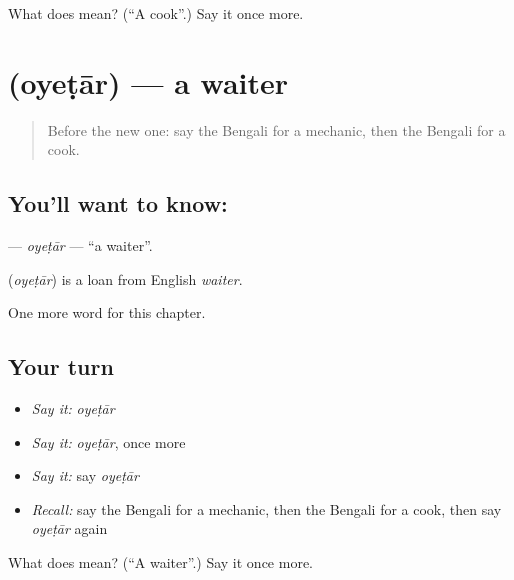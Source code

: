 \begin{tcolorbox}[breakable,colback=teal!4,colframe=teal!35!black,title={Before you move on}]
What does  mean? (\textquotedblleft{}A cook\textquotedblright{}.) Say it once more.
\end{tcolorbox}
\section[\texorpdfstring{\bn{ওয়েটার} (oyeṭār)}{ওয়েটার (oyeṭār)}]{ (oyeṭār) — a waiter}

\label{lesson:BN-C261-oyetar}



\begin{quote}
Before the new one: say the Bengali for a mechanic, then the Bengali for a cook.
\end{quote}

\subsection*{You'll want to know: }
\textbf{} — \emph{oyeṭār} — \textquotedblleft{}a waiter\textquotedblright{}.

\begin{cousinweb}
\textbf{} (\emph{oyeṭār}) is a loan from English \emph{waiter}.
\end{cousinweb}

\begin{grammarlens}[title={What you've built}]
One more word for this chapter.
\end{grammarlens}

\subsection*{Your turn}
\begin{itemize}
\raggedright
  \item \emph{Say it:} \emph{oyeṭār}
  \item \emph{Say it:} \emph{oyeṭār}, once more
  \item \emph{Say it:} say \emph{oyeṭār}
  \item \emph{Recall:} say the Bengali for a mechanic, then the Bengali for a cook, then say \emph{oyeṭār} again
\end{itemize}

\begin{tcolorbox}[breakable,colback=teal!4,colframe=teal!35!black,title={Before you move on}]
What does  mean? (\textquotedblleft{}A waiter\textquotedblright{}.) Say it once more.
\end{tcolorbox}
